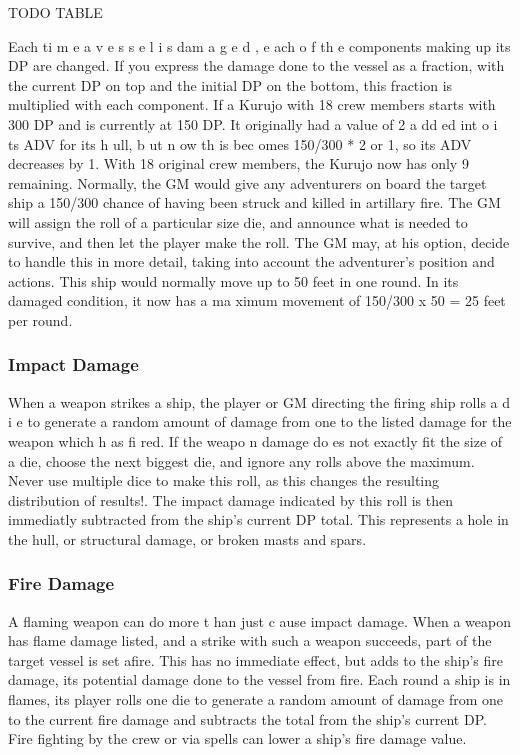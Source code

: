 \begin{multicols*}{2}
TODO TABLE 

Each ti m e a v e s s e l i s dam a g e d , e ach o f th e
components making up its DP are changed. If you express the
damage done to the vessel as a fraction, with the current DP
on top and the initial DP on the bottom, this fraction is
multiplied with each component.
If a Kurujo with 18 crew members starts with 300
DP and is currently at 150 DP. It originally had a value of 2
a dd ed int o i ts ADV for its h ull, b ut n ow th is bec omes
150/300 * 2 or 1, so its ADV decreases by 1.
With 18 original crew members, the Kurujo now
has only 9 remaining. Normally, the GM would give any
adventurers on board the target ship a 150/300 chance of
having been struck and killed in artillary fire. The GM will
assign the roll of a particular size die, and announce what is
needed to survive, and then let the player make the roll. The
GM may, at his option, decide to handle this in more detail,
taking into account the adventurer’s position and actions.
This ship would normally move up to 50 feet in one
round. In its damaged condition, it now has a ma ximum
movement of 150/300 x 50 = 25 feet per round.
\subsubsection{Impact Damage}
When a weapon strikes a ship, the player or GM
directing the firing ship rolls a d i e to generate a random
amount of damage from one to the listed damage for the
weapon which h as fi red. If the weapo n damage do es not
exactly fit the size of a die, choose the next biggest die, and
ignore any rolls above the maximum. Never use multiple dice
to make this roll, as this changes the resulting distribution of
results!.
The impact damage indicated by this roll is then
immediatly subtracted from the ship’s current DP total. This
represents a hole in the hull, or structural damage, or broken
masts and spars.
\subsubsection{Fire Damage}
A flaming weapon can do more t han just c ause
impact damage. When a weapon has flame damage listed, and
a strike with such a weapon succeeds, part of the target vessel
is set afire. This has no immediate effect, but adds to the
ship’s fire damage, its potential damage done to the vessel
from fire. Each round a ship is in flames, its player rolls one
die to generate a random amount of damage from one to the
current fire damage and subtracts the total from the ship’s
current DP. Fire fighting by the crew or via spells can lower a
ship’s fire damage value.

\end{multicols*}
